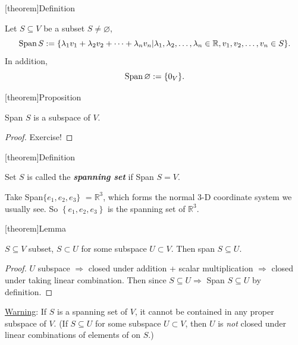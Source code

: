 \documentclass[12pt]{report}
\theoremstyle{definition}
\begin{document}
[theorem]{Definition}
\begin{span of a subset of vector space}
    Let $S \subseteq V$ be a subset $S \neq \varnothing$,\[
        \textnormal{Span}\,S:= \{\lambda_1 v_1 + \lambda_2 v_2 + \cdots + \lambda_n v_n |
        \lambda_1, \lambda_2, \ldots, \lambda_n \in \mathbb{R}, v_1, v_2, \ldots, v_n \in S\}.
    \]
    In addition, \[
        \textnormal{Span}\,\varnothing := \{0_V\}.
    \]
\end{span of a subset of vector space}

[theorem]{Proposition}
\begin{span S is a subspace}
    Span $S$ is a subspace of $V$.
\end{span S is a subspace}

\begin{proof}
    Exercise!
\end{proof}

[theorem]{Definition}
\begin{spanning set S}
    Set $S$ is called the \textbf{\emph{spanning set}} if Span $S = V$.
\end{spanning set S}

\begin{ex}
    Take Span$\{e_1, e_2, e_3\}$ $= \mathbb{R}^{3}$,
    which forms the normal 3-D coordinate system we usually see.
    So $\left\{e_1, e_2, e_3\right\}$ is the spanning set of $\mathbb{R}^{3}$.
\end{ex}

[theorem]{Lemma}
\begin{span of subset of subspace}\label{lemma:1}
    $S \subseteq V$ subset, $S \subset U$ for some subspace $U \subset V$.
    Then span $S \subseteq U$.
\end{span of subset of subspace}

\begin{proof}
    $U$ subspace $\Rightarrow{}$ closed under addition + scalar multiplication
    $\Rightarrow{}$ closed under taking linear combination.
    Then since $S \subseteq U \Rightarrow{}$ Span $S \subseteq U$ by definition.
\end{proof}

\underline{Warning}: If $S$ is a spanning set of $V$, it cannot be contained 
in any proper subspace of $V$.
(If $S \subseteq U$ for some subspace $U \subset V$, 
then $U$ is \emph{not} closed under linear combinations of elements of on $S$.)
\end{document}
